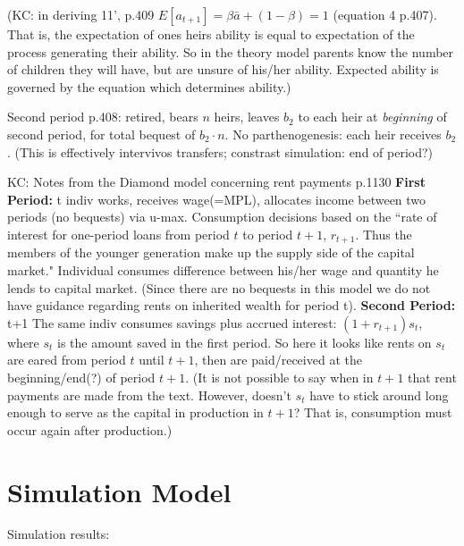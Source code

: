 \documentclass{article}
\begin{document}
(KC: in deriving 11', p.409 $E[a_{t+1}]=\beta \bar{a}+(1-\beta)=1$ (equation 4 p.407).  That is, the expectation of ones heirs ability is equal to expectation of the process generating their ability. So in the theory model parents know the number of children they will have, but are unsure of his/her ability.  Expected ability is governed by the equation which determines ability.)\newline

Second period p.408:
retired,
bears $n$ heirs,
leaves $b_{2}$ to each heir at \emph{beginning} of second period,
for total bequest of $b_{2} \cdot n$.
No parthenogenesis: each heir receives $b_{2}$.
(This is effectively intervivos transfers;
constrast simulation: end of period?)\newline

KC: Notes from the Diamond model concerning rent payments p.1130\newline
\textbf{First Period:} t\newline
indiv works, receives wage(=MPL), allocates income between two periods (no bequests) via u-max.\newline
Consumption decisions based on the ``rate of interest for one-period loans from period $t$ to period $t+1$, $r_{t+1}$.  Thus the members of the younger generation make up the supply side of the capital market."\newline
Individual consumes difference between his/her wage and quantity he lends to capital market.  (Since there are no bequests in this model we do not have guidance regarding rents on inherited wealth for period t).\newline
\noindent\textbf{Second Period:} t+1 \newline
The same indiv consumes savings plus accrued interest: $(1+r_{t+1})s_t$, where $s_t$ is the amount saved in the first period.  So here it looks like rents on $s_t$ are eared from period $t$ until $t+1$, then are paid/received at the beginning/end(?) of period $t+1$.  (It is not possible to say when in $t+1$ that rent payments are made from the text.  However, doesn't $s_t$ have to stick around long enough to serve as the capital in production in $t+1$?  That is, consumption must occur again after production.)

\section{Simulation Model}

Simulation results:
\end{document}
